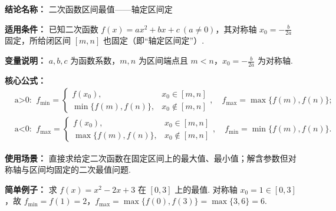 \textbf{结论名称：} 二次函数区间最值——轴定区间定

\textbf{适用条件：} 已知二次函数 \(f(x)=ax^{2}+bx+c\ (a\neq0)\)，其对称轴 \(x_0=-\frac{b}{2a}\) 固定，所给闭区间 \([m,n]\) 也固定（即“轴定区间定”）.

\textbf{变量说明：} \(a,b,c\) 为函数系数，\(m,n\) 为区间端点且 \(m<n\)，\(x_0=-\frac{b}{2a}\) 为对称轴.

\textbf{核心公式：}
\[
\boxed{
\begin{aligned}
&\text{a>0: }\ f_{\min}=
\begin{cases}
f(x_0), & x_0\in[m,n]\\
\min\{f(m),f(n)\}, & x_0\notin[m,n]
\end{cases},\quad f_{\max}=\max\{f(m),f(n)\};\\
&\text{a<0: }\ f_{\max}=
\begin{cases}
f(x_0), & x_0\in[m,n]\\
\max\{f(m),f(n)\}, & x_0\notin[m,n]
\end{cases},\quad f_{\min}=\min\{f(m),f(n)\}.
\end{aligned}
}
\]

\textbf{使用场景：} 直接求给定二次函数在固定区间上的最大值、最小值；解含参数但对称轴与区间均固定的二次最值问题.

\textbf{简单例子：} 求 \(f(x)=x^{2}-2x+3\) 在 \([0,3]\) 上的最值. 对称轴 \(x_0=1\in[0,3]\)，故 \(f_{\min}=f(1)=2\)，\(f_{\max}=\max\{f(0),f(3)\}=\max\{3,6\}=6\).